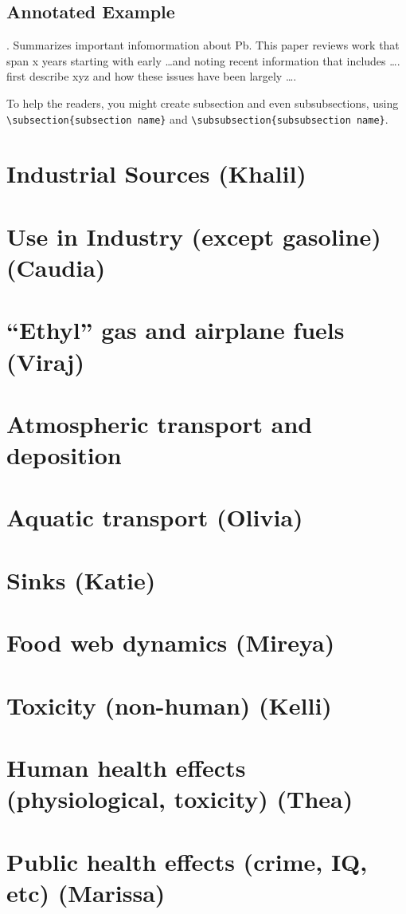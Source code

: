 \documentclass{article}\usepackage[]{graphicx}\usepackage[]{color}
\begin{document}
\subsection{Annotated Example}

\bigskip
\noindent {} . Summarizes important infomormation about Pb. This paper reviews work that span x years starting with early \ldots and noting recent information that includes \ldots. \cite{barltrop1975absorption} first describe xyz and how these issues have been largely \ldots.

\bigskip


To help the readers, you might create subsection and even subsubsections, using \verb!\subsection{subsection name}! and \verb!\subsubsection{subsubsection name}!. 


\section{Industrial Sources (Khalil)}


\section{Use in Industry (except gasoline) (Caudia)}

\section{``Ethyl'' gas and airplane fuels (Viraj)}

\section{Atmospheric transport and deposition}

\section{Aquatic transport (Olivia)}

\section{Sinks (Katie)}\section{Food web dynamics (Mireya)}

\section{Toxicity (non-human) (Kelli)}

\section{Human health effects (physiological, toxicity) (Thea)}

\section{Public health effects (crime, IQ, etc) (Marissa)}
\end{document}
